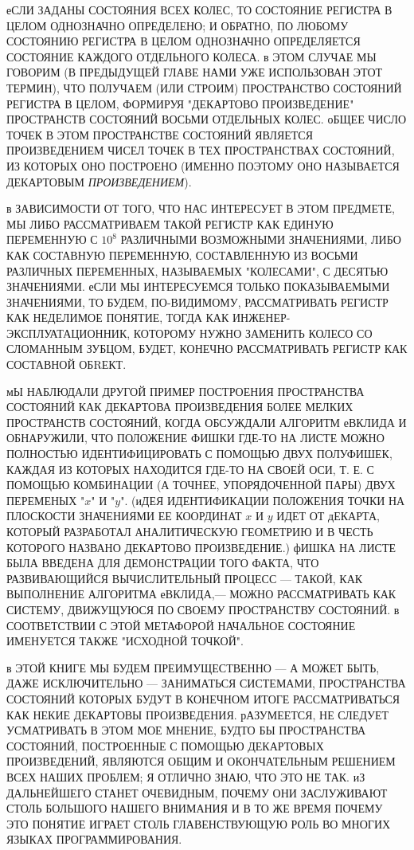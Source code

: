 еСЛИ ЗАДАНЫ СОСТОЯНИЯ ВСЕХ КОЛЕС, ТО СОСТОЯНИЕ
РЕГИСТРА В ЦЕЛОМ ОДНОЗНАЧНО ОПРЕДЕЛЕНО; И
ОБРАТНО, ПО ЛЮБОМУ СОСТОЯНИЮ РЕГИСТРА В ЦЕЛОМ
ОДНОЗНАЧНО ОПРЕДЕЛЯЕТСЯ СОСТОЯНИЕ КАЖДОГО
ОТДЕЛЬНОГО КОЛЕСА. в ЭТОМ СЛУЧАЕ МЫ ГОВОРИМ (В
ПРЕДЫДУЩЕЙ ГЛАВЕ НАМИ УЖЕ ИСПОЛЬЗОВАН ЭТОТ
ТЕРМИН), ЧТО ПОЛУЧАЕМ (ИЛИ СТРОИМ) ПРОСТРАНСТВО
СОСТОЯНИЙ РЕГИСТРА В ЦЕЛОМ, ФОРМИРУЯ "ДЕКАРТОВО
ПРОИЗВЕДЕНИЕ" ПРОСТРАНСТВ СОСТОЯНИЙ ВОСЬМИ
ОТДЕЛЬНЫХ КОЛЕС. оБЩЕЕ ЧИСЛО ТОЧЕК В ЭТОМ
ПРОСТРАНСТВЕ СОСТОЯНИЙ ЯВЛЯЕТСЯ ПРОИЗВЕДЕНИЕМ
ЧИСЕЛ ТОЧЕК В ТЕХ ПРОСТРАНСТВАХ СОСТОЯНИЙ, ИЗ
КОТОРЫХ ОНО ПОСТРОЕНО (ИМЕННО ПОЭТОМУ ОНО
НАЗЫВАЕТСЯ ДЕКАРТОВЫМ \emph{ПРОИЗВЕДЕНИЕМ}).

в ЗАВИСИМОСТИ ОТ ТОГО, ЧТО НАС ИНТЕРЕСУЕТ В ЭТОМ
ПРЕДМЕТЕ, МЫ ЛИБО РАССМАТРИВАЕМ ТАКОЙ РЕГИСТР
КАК ЕДИНУЮ ПЕРЕМЕННУЮ С $10^8$  РАЗЛИЧНЫМИ
ВОЗМОЖНЫМИ ЗНАЧЕНИЯМИ, ЛИБО КАК СОСТАВНУЮ
ПЕРЕМЕННУЮ, СОСТАВЛЕННУЮ ИЗ ВОСЬМИ РАЗЛИЧНЫХ
ПЕРЕМЕННЫХ, НАЗЫВАЕМЫХ "КОЛЕСАМИ", С ДЕСЯТЬЮ
ЗНАЧЕНИЯМИ. еСЛИ МЫ ИНТЕРЕСУЕМСЯ ТОЛЬКО
ПОКАЗЫВАЕМЫМИ ЗНАЧЕНИЯМИ, ТО БУДЕМ, ПО-ВИДИМОМУ,
РАССМАТРИВАТЬ РЕГИСТР КАК НЕДЕЛИМОЕ ПОНЯТИЕ,
ТОГДА КАК ИНЖЕНЕР-ЭКСПЛУАТАЦИОННИК, КОТОРОМУ
НУЖНО ЗАМЕНИТЬ КОЛЕСО СО СЛОМАННЫМ ЗУБЦОМ,
БУДЕТ, КОНЕЧНО РАССМАТРИВАТЬ РЕГИСТР КАК
СОСТАВНОЙ ОБRЕКТ.

мЫ НАБЛЮДАЛИ ДРУГОЙ ПРИМЕР ПОСТРОЕНИЯ ПРОСТРАНСТВА
СОСТОЯНИЙ КАК ДЕКАРТОВА ПРОИЗВЕДЕНИЯ БОЛЕЕ
МЕЛКИХ ПРОСТРАНСТВ СОСТОЯНИЙ, КОГДА ОБСУЖДАЛИ
АЛГОРИТМ еВКЛИДА И ОБНАРУЖИЛИ, ЧТО ПОЛОЖЕНИЕ
ФИШКИ ГДЕ-ТО НА ЛИСТЕ МОЖНО ПОЛНОСТЬЮ
ИДЕНТИФИЦИРОВАТЬ С ПОМОЩЬЮ ДВУХ ПОЛУФИШЕК,
КАЖДАЯ ИЗ КОТОРЫХ НАХОДИТСЯ ГДЕ-ТО НА СВОЕЙ ОСИ,
Т. Е. С ПОМОЩЬЮ КОМБИНАЦИИ (А ТОЧНЕЕ,
УПОРЯДОЧЕННОЙ ПАРЫ) ДВУХ ПЕРЕМЕНЫХ "$x$" И
"$y$". (иДЕЯ ИДЕНТИФИКАЦИИ ПОЛОЖЕНИЯ ТОЧКИ НА
ПЛОСКОСТИ ЗНАЧЕНИЯМИ ЕЕ КООРДИНАТ $x$ И $y$ ИДЕТ
ОТ дЕКАРТА, КОТОРЫЙ РАЗРАБОТАЛ АНАЛИТИЧЕСКУЮ
ГЕОМЕТРИЮ И В ЧЕСТЬ КОТОРОГО НАЗВАНО ДЕКАРТОВО
ПРОИЗВЕДЕНИЕ.) фИШКА НА ЛИСТЕ БЫЛА ВВЕДЕНА ДЛЯ
ДЕМОНСТРАЦИИ ТОГО ФАКТА, ЧТО РАЗВИВАЮЩИЙСЯ
ВЫЧИСЛИТЕЛЬНЫЙ ПРОЦЕСС --- ТАКОЙ, КАК ВЫПОЛНЕНИЕ
АЛГОРИТМА еВКЛИДА,--- МОЖНО РАССМАТРИВАТЬ КАК
СИСТЕМУ, ДВИЖУЩУЮСЯ ПО СВОЕМУ ПРОСТРАНСТВУ
СОСТОЯНИЙ. в СООТВЕТСТВИИ С ЭТОЙ МЕТАФОРОЙ
НАЧАЛЬНОЕ СОСТОЯНИЕ ИМЕНУЕТСЯ ТАКЖЕ "ИСХОДНОЙ
ТОЧКОЙ".

в ЭТОЙ КНИГЕ МЫ БУДЕМ ПРЕИМУЩЕСТВЕННО --- А МОЖЕТ
БЫТЬ, ДАЖЕ ИСКЛЮЧИТЕЛЬНО --- ЗАНИМАТЬСЯ
СИСТЕМАМИ, ПРОСТРАНСТВА СОСТОЯНИЙ КОТОРЫХ БУДУТ
В КОНЕЧНОМ ИТОГЕ РАССМАТРИВАТЬСЯ КАК НЕКИЕ
ДЕКАРТОВЫ ПРОИЗВЕДЕНИЯ. рАЗУМЕЕТСЯ, НЕ СЛЕДУЕТ
УСМАТРИВАТЬ В ЭТОМ МОЕ МНЕНИЕ, БУДТО БЫ
ПРОСТРАНСТВА СОСТОЯНИЙ, ПОСТРОЕННЫЕ С ПОМОЩЬЮ
ДЕКАРТОВЫХ ПРОИЗВЕДЕНИЙ, ЯВЛЯЮТСЯ ОБЩИМ И
ОКОНЧАТЕЛЬНЫМ РЕШЕНИЕМ ВСЕХ НАШИХ ПРОБЛЕМ; Я
ОТЛИЧНО ЗНАЮ, ЧТО ЭТО НЕ ТАК. иЗ ДАЛЬНЕЙШЕГО
СТАНЕТ ОЧЕВИДНЫМ, ПОЧЕМУ ОНИ ЗАСЛУЖИВАЮТ СТОЛЬ
БОЛЬШОГО НАШЕГО ВНИМАНИЯ И В ТО ЖЕ ВРЕМЯ ПОЧЕМУ
ЭТО ПОНЯТИЕ ИГРАЕТ СТОЛЬ ГЛАВЕНСТВУЮЩУЮ РОЛЬ ВО
МНОГИХ ЯЗЫКАХ ПРОГРАММИРОВАНИЯ.

